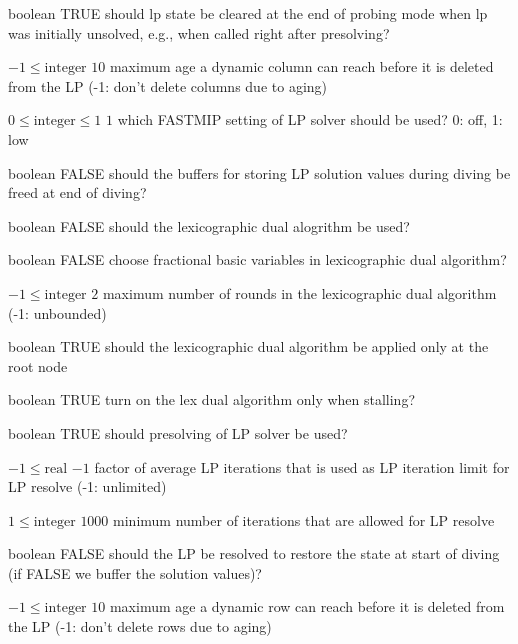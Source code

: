 %
{boolean}%
{TRUE}%
{should lp state be cleared at the end of probing mode when lp was initially unsolved, e.g., when called right after presolving?}%
{}

%
{$-1\leq\textrm{integer}$}%
{$10$}%
{maximum age a dynamic column can reach before it is deleted from the LP (-1: don't delete columns due to aging)}%
{}

%
{$0\leq\textrm{integer}\leq1$}%
{$1$}%
{which FASTMIP setting of LP solver should be used? 0: off, 1: low}%
{}

%
{boolean}%
{FALSE}%
{should the buffers for storing LP solution values during diving be freed at end of diving?}%
{}

%
{boolean}%
{FALSE}%
{should the lexicographic dual alogrithm be used?}%
{}

%
{boolean}%
{FALSE}%
{choose fractional basic variables in lexicographic dual algorithm?}%
{}

%
{$-1\leq\textrm{integer}$}%
{$2$}%
{maximum number of rounds in the  lexicographic dual algorithm (-1: unbounded)}%
{}

%
{boolean}%
{TRUE}%
{should the lexicographic dual algorithm be applied only at the root node}%
{}

%
{boolean}%
{TRUE}%
{turn on the lex dual algorithm only when stalling?}%
{}

%
{boolean}%
{TRUE}%
{should presolving of LP solver be used?}%
{}

%
{$-1\leq\textrm{real}$}%
{$-1$}%
{factor of average LP iterations that is used as LP iteration limit for LP resolve (-1: unlimited)}%
{}

%
{$1\leq\textrm{integer}$}%
{$1000$}%
{minimum number of iterations that are allowed for LP resolve}%
{}

%
{boolean}%
{FALSE}%
{should the LP be resolved to restore the state at start of diving (if FALSE we buffer the solution values)?}%
{}

%
{$-1\leq\textrm{integer}$}%
{$10$}%
{maximum age a dynamic row can reach before it is deleted from the LP (-1: don't delete rows due to aging)}%
{}

